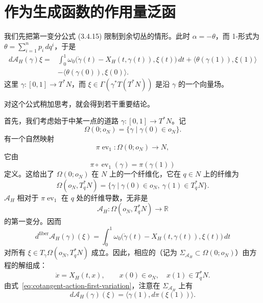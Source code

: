 \section{作为生成函数的作用量泛函}
\label{sec:action-functional-generating-function}

我们先把第一变分公式 (3.4.15) 限制到余切丛的情形。此时 $\alpha=-\theta$，而\personLiouville{} 1-形式为 $\theta=\sum_{i=1}^n p_i\,dq^i$，于是
\begin{equation}
\begin{split}
  d\mathcal A_H(\gamma)\xi
  ={}&\int_0^1\omega_0\bigl(\dot\gamma(t)-X_H(t,\gamma(t)),\xi(t)\bigr)\,dt
      +\bigl\langle\theta(\gamma(1)),\xi(1)\bigr\rangle \\
     &-\bigl\langle\theta(\gamma(0)),\xi(0)\bigr\rangle .
\end{split}
\label{eq:cotangent-action-first-variation}
\end{equation}
这里 $\gamma:[0,1]\to T^*N$，而 $\xi\in\Gamma(\gamma^*T(T^*N))$ 是沿 $\gamma$ 的一个向量场。

对这个公式稍加思考，就会得到若干重要结论。

首先，我们考虑始于\termZeroSection{}中某一点的道路 $\gamma:[0,1]\to T^*N$。记
\[
  \Omega(0;o_N)=\{\gamma\mid\gamma(0)\in o_N\}.
\]
有一个自然映射
\[
  \pi\operatorname{ev}_1:\Omega(0;o_N)\longrightarrow N,
\]
它由
\begin{equation}
  \pi\circ\operatorname{ev}_1(\gamma)=\pi(\gamma(1))
  \label{eq:projection-evaluation}
\end{equation}
定义。这给出了 $\Omega(0;o_N)$ 在 $N$ 上的一个纤维化，它在 $q\in N$ 上的纤维为
\[
  \Omega(o_N,T_q^*N)
  =\{\gamma\mid\gamma(0)\in o_N,\ \gamma(1)\in T_q^*N\}.
\]
$\mathcal A_H$ 相对于 $\pi\operatorname{ev}_1$ 在 $q$ 处的纤维导数，无非是
\[
  \mathcal A_H:\Omega(o_N,T_q^*N)\longrightarrow\mathbb R
\]
的第一变分。因而
\[
  d^{\mathrm{fiber}}\mathcal A_H(\gamma)(\xi)
  =\int_0^1\omega_0\bigl(\dot\gamma(t)-X_H(t,\gamma(t)),\xi(t)\bigr)\,dt
\]
对所有 $\xi\in T_\gamma\Omega(o_N,T_q^*N)$ 成立。因此，相应的\termFiberCriticalSet{}（记为 $\Sigma_{\mathcal A_H}\subset\Omega(0;o_N)$）由\personHamilton{}方程的解组成：
\[
  \dot x=X_H(t,x),\qquad x(0)\in o_N,\quad x(1)\in T_q^*N.
\]
由式~\eqref{eq:cotangent-action-first-variation}，注意在 $\Sigma_{\mathcal A_H}$ 上有
\[
  d\mathcal A_H(\gamma)(\xi)
  =\bigl\langle\gamma(1),d\pi(\xi(1))\bigr\rangle.
\]

